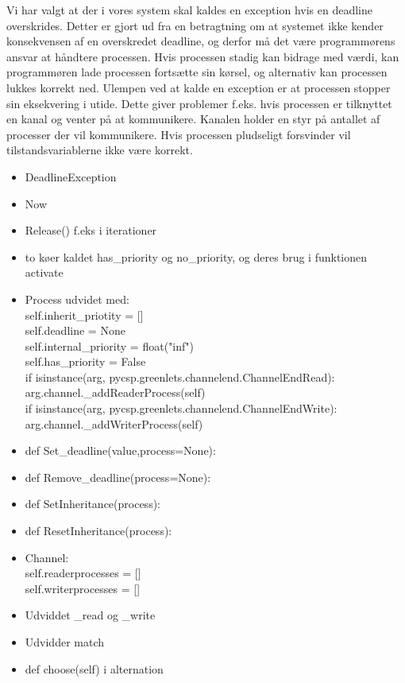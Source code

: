 Vi har valgt at der i vores system skal kaldes en exception hvis en deadline overskrides. Detter er gjort ud fra en betragtning om at systemet ikke kender konsekvensen af en overskredet deadline, og derfor må det være programmørens ansvar at håndtere processen.  Hvis processen stadig kan bidrage med værdi, kan programmøren lade processen fortsætte sin kørsel, og alternativ kan processen lukkes korrekt ned. Ulempen ved at kalde en exception er at processen stopper sin eksekvering i utide. Dette giver problemer f.eks. hvis processen er tilknyttet en kanal og venter på at kommunikere.  Kanalen holder en styr på antallet af processer der vil kommunikere. Hvis processen pludseligt forsvinder vil tilstandsvariablerne ikke være korrekt.


\begin{itemize}
\tightlist
\item DeadlineException
\item Now
\item Release() f.eks i iterationer
\item to køer kaldet has\_priority og no\_priority, og deres brug i funktionen activate
\item Process udvidet med: \\self.inherit\_priotity = []     \\
        self.deadline = None\\
        self.internal\_priority = float("inf")\\
        self.has\_priority = False\\
            if isinstance(arg, pycsp.greenlets.channelend.ChannelEndRead):\\
                arg.channel.\_addReaderProcess(self)\\
            if isinstance(arg, pycsp.greenlets.channelend.ChannelEndWrite):\\
                arg.channel.\_addWriterProcess(self)
\item def Set\_deadline(value,process=None):
\item def Remove\_deadline(process=None):
\item def SetInheritance(process):
\item def ResetInheritance(process):
\item Channel:\\
        self.readerprocesses = []\\
        self.writerprocesses = []

\item Udviddet \_read og \_write
\item Udvidder match
\item     def choose(self) i alternation


\end{itemize}
